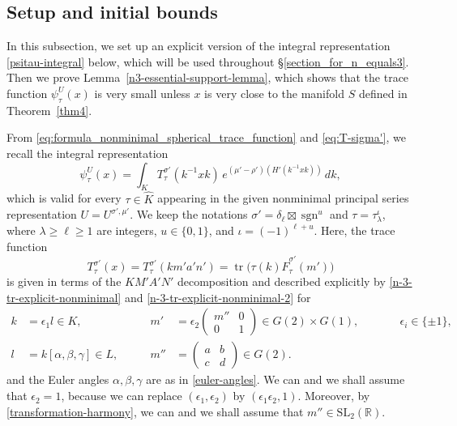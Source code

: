\documentclass[11pt,oneside]{amsart}
\numberwithin{equation}{section}
\theoremstyle{remark}
\theoremstyle{plain}
\DeclareMathOperator{\sgn}{sgn}
\DeclareMathOperator{\tr}{tr}
\newcommand\SL{\mathrm{SL}}
\newcommand\RR{\mathbb{R}}
\renewcommand\geq{\geqslant}
\begin{document}
\subsection{Setup and initial bounds}
\label{n3-initial-subsec}
In this subsection, we set up an explicit version of the integral representation \eqref{psitau-integral} below, which will be used throughout \S\ref{section_for_n_equals3}. Then we prove Lemma~\ref{n3-essential-support-lemma}, which shows that the trace function $\psi_{\tau}^U(x)$ is very small unless $x$ is very close to the manifold $S$ defined in Theorem~\ref{thm4}.

From \eqref{eq:formula_nonminimal_spherical_trace_function} and \eqref{eq:T-sigma'}, we recall the integral representation
\begin{equation}
\label{psitau-integral}
\psi_{\tau}^{U}(x)=\int_KT_\tau^{\sigma'}(k^{-1}xk)\,e^{(\mu'-\rho')(H'(k^{-1}xk))}\,dk,
\end{equation}
which is valid for every $\tau\in\widehat{K}$ appearing in the given nonminimal principal series representation $U=U^{\sigma',\mu'}$. We keep the notations $\sigma'=\delta_{\ell}\boxtimes\sgn^u$ and $\tau=\tau_{\lambda}^{\iota}$, where $\lambda\geq \ell\geq 1$ are integers, $u\in\{0,1\}$, and $\iota=(-1)^{\ell+u}$. Here, the trace function
\[ T_\tau^{\sigma'}(x)=T_\tau^{\sigma'}(km'a'n')=\tr\big(\tau(k)\hat{F}^{\sigma'}_{\tau}(m')\big) \]
is given in terms of the $KM'A'N'$ decomposition and described explicitly
by \eqref{n-3-tr-explicit-nonminimal} and \eqref{n-3-tr-explicit-nonminimal-2} for
\begin{equation}\label{kmprime-parametrization}
\begin{alignedat}{3}
k&=\epsilon_1 l\in K,& m'&=\epsilon_2\begin{pmatrix}m''&0\\0&1\end{pmatrix}\in G(2)\times G(1),&\qquad & \epsilon_i\in\{\pm 1\}, \\
l&=k[\alpha,\beta,\gamma]\in L,\qquad& m''&=\begin{pmatrix} a&b\\c&d\end{pmatrix}\in G(2).&&
\end{alignedat}
\end{equation}
and the Euler angles $\alpha,\beta,\gamma$ are as in \eqref{euler-angles}. We can and we shall assume that $\epsilon_2=1$, because we can replace $(\epsilon_1,\epsilon_2)$ by $(\epsilon_1\epsilon_2,1)$. Moreover, by \eqref{transformation-harmony}, we can and we shall assume that $m''\in\SL_2(\RR)$.
\end{document}
